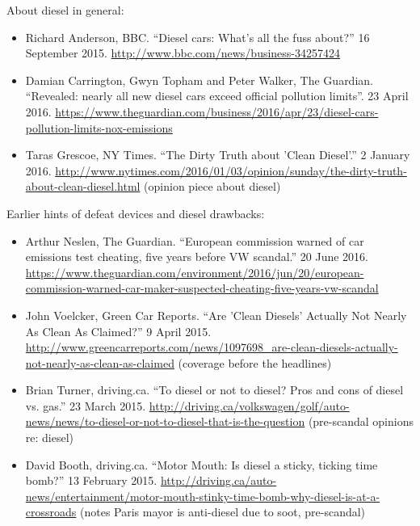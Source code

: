 \documentclass[11pt]{article}
\begin{document}
\noindent
About diesel in general:
\begin{itemize}
\item Richard Anderson, BBC. ``Diesel cars: What's all the fuss about?'' 16 September 2015. \url{http://www.bbc.com/news/business-34257424}
\item Damian Carrington, Gwyn Topham and Peter Walker, The Guardian. ``Revealed: nearly all new diesel cars exceed official pollution limits''. 23 April 2016. \url{https://www.theguardian.com/business/2016/apr/23/diesel-cars-pollution-limits-nox-emissions}
\item Taras Grescoe, NY Times. ``The Dirty Truth about 'Clean Diesel'.'' 2 January 2016. \url{http://www.nytimes.com/2016/01/03/opinion/sunday/the-dirty-truth-about-clean-diesel.html} (opinion piece about diesel)
\end{itemize}

\noindent
Earlier hints of defeat devices and diesel drawbacks:
\begin{itemize}
\item Arthur Neslen, The Guardian. ``European commission warned of car emissions test cheating, five years before VW scandal.'' 20 June 2016. \url{https://www.theguardian.com/environment/2016/jun/20/european-commission-warned-car-maker-suspected-cheating-five-years-vw-scandal}
\item John Voelcker, Green Car Reports. ``Are 'Clean Diesels' Actually Not Nearly As Clean As Claimed?'' 9 April 2015. \url{http://www.greencarreports.com/news/1097698_are-clean-diesels-actually-not-nearly-as-clean-as-claimed} (coverage before the headlines)
\item Brian Turner, driving.ca. ``To diesel or not to diesel? Pros and cons of diesel vs. gas.'' 23 March 2015. \url{http://driving.ca/volkswagen/golf/auto-news/news/to-diesel-or-not-to-diesel-that-is-the-question} (pre-scandal opinions re: diesel)
\item David Booth, driving.ca. ``Motor Mouth: Is diesel a sticky, ticking time bomb?'' 13 February 2015. \url{http://driving.ca/auto-news/entertainment/motor-mouth-stinky-time-bomb-why-diesel-is-at-a-crossroads} (notes Paris mayor is anti-diesel due to soot, pre-scandal)
\end{itemize}
\end{document}
